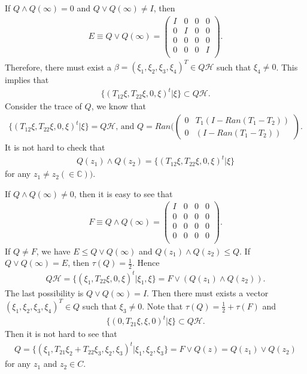 \documentclass[a4paper,10pt]{amsart}
\newcommand{\HHH}{\mathcal H} %
\newcommand{\C}{\mathbb C} %
\begin{document}
If $Q \wedge Q(\infty) = 0$ and $Q \vee Q(\infty) \neq I$, then
\begin{align*}
    E \equiv Q \vee Q(\infty) = 
    \begin{pmatrix}
        I & 0 & 0 & 0\\
        0 & I & 0 & 0\\
        0 & 0 & 0 & 0\\
        0 & 0 & 0 & I \\
    \end{pmatrix}.
\end{align*}
Therefore, there must exist a $\beta = (\xi_1, \xi_2, \xi_3, \xi_4)^{T}
\in Q\HHH$ such that $\xi_4 \neq 0$. This implies that
\begin{align*}
    \{(T_{12}\xi, T_{22}\xi, 0, \xi)^{t}| \xi \} \subset Q\HHH.
\end{align*}
Consider the trace of $Q$, we know that 
\begin{align*}
\{(T_{12}\xi, T_{22}\xi, 0, \xi)^{t}| \xi \}= Q\HHH \mbox{, and }
    Q = Ran(
    \begin{pmatrix}
        0 & T_{1}(I-Ran(T_1 - T_2))\\
        0 & (I-Ran(T_1 - T_2)) 
    \end{pmatrix}.
\end{align*}
It is not hard to check that
\begin{align*}
    Q(z_{1}) \wedge Q(z_{2}) =
    \{(T_{12}\xi, T_{22}\xi, 0, \xi)^{t}| \xi \}
\end{align*}
for any $z_1 \neq z_2 (\in \C))$.

If $Q \wedge Q(\infty) \neq 0$, then it is easy to see that
\begin{align*}
   F \equiv Q \wedge Q(\infty) = 
    \begin{pmatrix}
        I & 0 & 0 & 0\\
        0 & 0 & 0 & 0 \\
        0 & 0 & 0 & 0 \\
        0 & 0 & 0 & 0 \\
    \end{pmatrix}.
\end{align*}
If $Q \neq F$, we have 
$E \leq Q \vee Q(\infty)$ and $Q(z_1) \wedge Q(z_2) \leq Q$.
If $Q \vee Q(\infty) = E$, then $\tau(Q) = \frac{1}{2}$. Hence
\begin{align*}
    Q\HHH =
    \{(\xi_1, T_{22}\xi, 0,\xi)^{t}| \xi_1, \xi \} 
    = F \vee (Q(z_1) \wedge Q(z_2)). 
\end{align*}
The last possibility is $Q \vee Q(\infty) = I$. Then there must 
exists a vector $(\xi_1, \xi_2, \xi_3, \xi_4)^{T} \in Q$ such that
$\xi_3 \neq 0$. Note that $\tau(Q) = \frac{1}{2} + \tau(F)$ and
\begin{align*}
    \{(0,T_{21}\xi,\xi,0)^{t} | \xi \} \subset Q\HHH.
\end{align*}
Then it is not hard to see that
\begin{align*}
   Q=\{(\xi_1, T_{21}\xi_{2} + T_{22}\xi_3,\xi_{2},\xi_{3})^{t} 
   | \xi_1, \xi_2, \xi_3 \} = F \vee Q(z) = Q(z_1)\vee Q(z_2)   
\end{align*}
for any $z_1$ and $z_2 \in C$.
\end{document}
